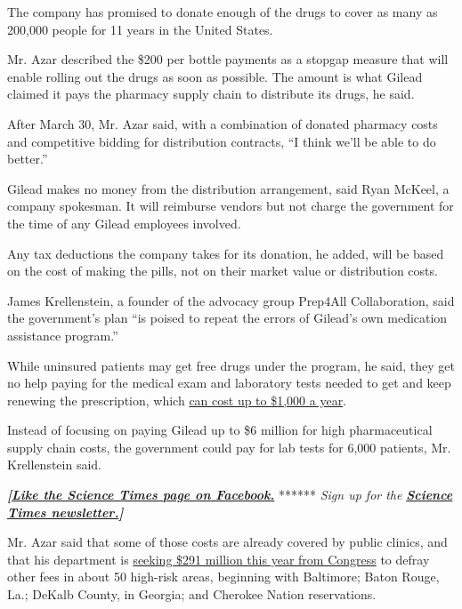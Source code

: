 The company has promised to donate enough of the drugs to cover as many
as 200,000 people for 11 years in the United States.

Mr. Azar described the \$200 per bottle payments as a stopgap measure
that will enable rolling out the drugs as soon as possible. The amount
is what Gilead claimed it pays the pharmacy supply chain to distribute
its drugs, he said.

After March 30, Mr. Azar said, with a combination of donated pharmacy
costs and competitive bidding for distribution contracts, ``I think
we'll be able to do better.''

Gilead makes no money from the distribution arrangement, said Ryan
McKeel, a company spokesman. It will reimburse vendors but not charge
the government for the time of any Gilead employees involved.

Any tax deductions the company takes for its donation, he added, will be
based on the cost of making the pills, not on their market value or
distribution costs.

James Krellenstein, a founder of the advocacy group Prep4All
Collaboration, said the government's plan ``is poised to repeat the
errors of Gilead's own medication\\
assistance program.''

While uninsured patients may get free drugs under the program, he said,
they get no help paying for the medical exam and laboratory tests needed
to get and keep renewing the prescription, which
\href{https://breakthepatent.org/wp-content/uploads/2018/07/White_Paper_Final_Edits-PS-Version.pdf}{can
cost up to \$1,000 a year}.

Instead of focusing on paying Gilead up to \$6 million for high
pharmaceutical supply chain costs, the government could pay for lab
tests for 6,000 patients, Mr. Krellenstein said.

\textbf{\emph{{[}}\href{http://on.fb.me/1paTQ1h}{\emph{Like the Science
Times page on Facebook.}}} ****** \emph{\textbar{} Sign up for the}
\textbf{\href{http://nyti.ms/1MbHaRU}{\emph{Science Times
newsletter.}}\emph{{]}}}

Mr. Azar said that some of those costs are already covered by public
clinics, and that his department is
\href{https://www.nytimes3xbfgragh.onion/2019/03/12/health/trump-hiv-aids-costs.html}{seeking
\$291 million this year from Congress} to defray other fees in about 50
high-risk areas, beginning with Baltimore; Baton Rouge, La.; DeKalb
County, in Georgia; and Cherokee Nation reservations.

